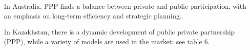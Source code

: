 
\begin{multicols}{2}
In Australia, PPP finds a balance between private and public
participation, with an emphasis on long-term efficiency and strategic
planning.

In Kazakhstan, there is a dynamic development of public private
partnership (PPP), while a variety of models are used in the market: see
table 6.
\end{multicols}



